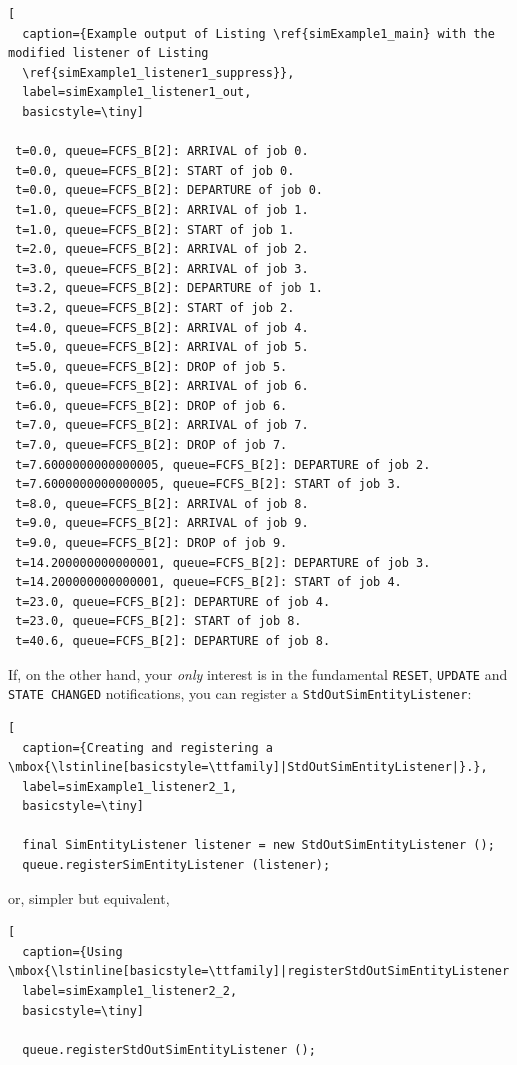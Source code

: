 \documentclass[12pt]{book}
\begin{document}
\begin{lstlisting}[
  caption={Example output of Listing \ref{simExample1_main} with the modified listener of Listing
  \ref{simExample1_listener1_suppress}},
  label=simExample1_listener1_out,
  basicstyle=\tiny]

 t=0.0, queue=FCFS_B[2]: ARRIVAL of job 0.
 t=0.0, queue=FCFS_B[2]: START of job 0.
 t=0.0, queue=FCFS_B[2]: DEPARTURE of job 0.
 t=1.0, queue=FCFS_B[2]: ARRIVAL of job 1.
 t=1.0, queue=FCFS_B[2]: START of job 1.
 t=2.0, queue=FCFS_B[2]: ARRIVAL of job 2.
 t=3.0, queue=FCFS_B[2]: ARRIVAL of job 3.
 t=3.2, queue=FCFS_B[2]: DEPARTURE of job 1.
 t=3.2, queue=FCFS_B[2]: START of job 2.
 t=4.0, queue=FCFS_B[2]: ARRIVAL of job 4.
 t=5.0, queue=FCFS_B[2]: ARRIVAL of job 5.
 t=5.0, queue=FCFS_B[2]: DROP of job 5.
 t=6.0, queue=FCFS_B[2]: ARRIVAL of job 6.
 t=6.0, queue=FCFS_B[2]: DROP of job 6.
 t=7.0, queue=FCFS_B[2]: ARRIVAL of job 7.
 t=7.0, queue=FCFS_B[2]: DROP of job 7.
 t=7.6000000000000005, queue=FCFS_B[2]: DEPARTURE of job 2.
 t=7.6000000000000005, queue=FCFS_B[2]: START of job 3.
 t=8.0, queue=FCFS_B[2]: ARRIVAL of job 8.
 t=9.0, queue=FCFS_B[2]: ARRIVAL of job 9.
 t=9.0, queue=FCFS_B[2]: DROP of job 9.
 t=14.200000000000001, queue=FCFS_B[2]: DEPARTURE of job 3.
 t=14.200000000000001, queue=FCFS_B[2]: START of job 4.
 t=23.0, queue=FCFS_B[2]: DEPARTURE of job 4.
 t=23.0, queue=FCFS_B[2]: START of job 8.
 t=40.6, queue=FCFS_B[2]: DEPARTURE of job 8.

\end{lstlisting}

If, on the other hand, your {\em only\/} interest is in the
  fundamental \lstinline|RESET|, \lstinline|UPDATE| and \lstinline|STATE CHANGED|
  notifications,
  you can register a \lstinline|StdOutSimEntityListener|:

\begin{lstlisting}[
  caption={Creating and registering a \mbox{\lstinline[basicstyle=\ttfamily]|StdOutSimEntityListener|}.},
  label=simExample1_listener2_1,
  basicstyle=\tiny]

  final SimEntityListener listener = new StdOutSimEntityListener ();
  queue.registerSimEntityListener (listener);

\end{lstlisting}

or, simpler but equivalent,

\begin{lstlisting}[
  caption={Using \mbox{\lstinline[basicstyle=\ttfamily]|registerStdOutSimEntityListener|}.},
  label=simExample1_listener2_2,
  basicstyle=\tiny]

  queue.registerStdOutSimEntityListener ();

\end{lstlisting}
\end{document}
